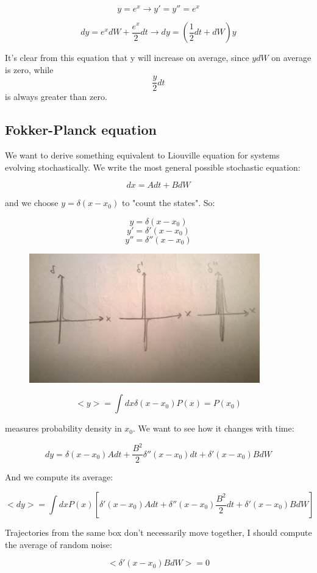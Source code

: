 \documentclass[a4paper, italian, openany]{book}
\begin{document}
$$y= e^{x} \rightarrow y'=y''=e^{x}$$

$$dy = e^{x}dW+\frac{e^x}{2}dt \rightarrow dy = \left ( \frac{1}{2}dt + dW \right ) y$$

It's clear from this equation that y will increase on average, since $ydW$ on average is zero, while $$\frac{y}{2}dt$$ is always greater than zero.

\subsection{Fokker-Planck equation}

We want to derive something equivalent to Liouville equation for systems evolving stochastically. We write the most general possible stochastic equation:

$$dx = A dt + B dW$$

and we choose $y= \delta(x-x_0)$ to "count the states". So:

$$y= \delta(x-x_0)$$
$$y'= \delta'(x-x_0)$$
$$y''= \delta''(x-x_0)$$

\begin{figure}[H]
\centering
\includegraphics[width=100mm]{img/pic25.jpg}
\end{figure}

$$<y> = \int dx \delta(x-x_0)P(x) = P(x_0)$$

measures probability density in $x_0$. We want to see how it changes with time:

$$dy = \delta(x-x_0) A dt + \frac{B^2}{2}\delta''(x-x_0)dt + \delta'(x-x_0)BdW$$

And we compute its average:

$$<dy> = \int dx P(x) \left [ \delta'(x-x_0)Adt+\delta''(x-x_0)\frac{B^2}{2}dt + \delta'(x-x_0)BdW \right ]$$

Trajectories from the same box don't necessarily move together, I should compute the average of random noise:

$$<\delta'(x-x_0)BdW> = 0$$
\end{document}
